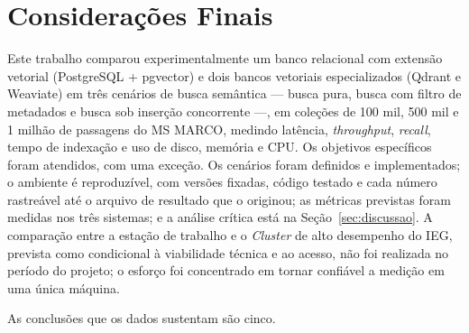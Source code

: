
\section{Considerações Finais}

Este trabalho comparou experimentalmente um banco relacional com extensão vetorial (PostgreSQL + pgvector) e dois bancos vetoriais especializados (Qdrant e Weaviate) em três cenários de busca semântica --- busca pura, busca com filtro de metadados e busca sob inserção concorrente ---, em coleções de 100 mil, 500 mil e 1 milhão de passagens do MS MARCO, medindo latência, \textit{throughput}, \textit{recall}, tempo de indexação e uso de disco, memória e CPU. Os objetivos específicos foram atendidos, com uma exceção. Os cenários foram definidos e implementados; o ambiente é reproduzível, com versões fixadas, código testado e cada número rastreável até o arquivo de resultado que o originou; as métricas previstas foram medidas nos três sistemas; e a análise crítica está na Seção~\ref{sec:discussao}. A comparação entre a estação de trabalho e o \textit{Cluster} de alto desempenho do IEG, prevista como condicional à viabilidade técnica e ao acesso, não foi realizada no período do projeto; o esforço foi concentrado em tornar confiável a medição em uma única máquina.

As conclusões que os dados sustentam são cinco.

